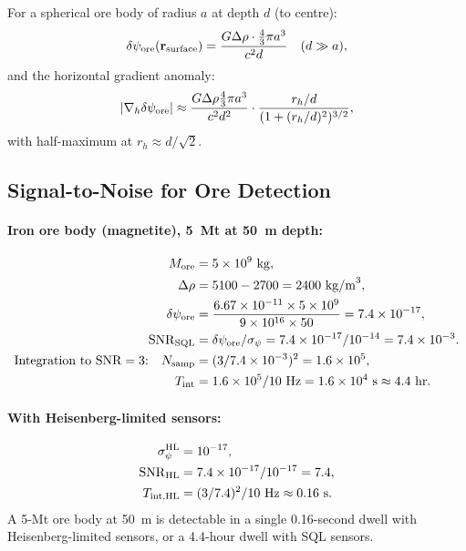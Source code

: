 \documentclass[aps,prd,twocolumn,superscriptaddress,nofootinbib]{revtex4-2}
\newcommand{\HL}{\mathrm{HL}}
\begin{document}
For a spherical ore body of radius $a$ at depth $d$ (to centre):
\begin{equation}
  \delta\psi_{\rm ore}(\mathbf{r}_{\rm surface})
  = \frac{G \Delta\rho \cdot \tfrac{4}{3}\pi a^3}{c^2 d}
  \quad(d \gg a),
  \label{eq:ore-psi}
\end{equation}
and the horizontal gradient anomaly:
\begin{equation}
  |\nabla_h\delta\psi_{\rm ore}| \approx \frac{G \Delta\rho \tfrac{4}{3}\pi a^3}
  {c^2 d^2}\cdot\frac{r_h/d}{(1 + (r_h/d)^2)^{3/2}},
  \label{eq:ore-grad}
\end{equation}
with half-maximum at $r_h \approx d/\sqrt{2}$.

\subsection{Signal-to-Noise for Ore Detection}

\paragraph{Iron ore body (magnetite), 5~Mt at 50~m depth:}
\begin{align}
  M_{\rm ore} &= 5\times10^9~\mathrm{kg}, \\
  \Delta\rho &= 5100 - 2700 = 2400~\mathrm{kg/m}^3, \\
  \delta\psi_{\rm ore} &= \frac{6.67\times10^{-11}\times5\times10^9}
  {9\times10^{16}\times50}
  = 7.4\times10^{-17}, \\
  \mathrm{SNR}_{\rm SQL} &= \delta\psi_{\rm ore}/\sigma_\psi
  = 7.4\times10^{-17}/10^{-14} = 7.4\times10^{-3}. \\
  \text{Integration to SNR}=3{:}\quad N_{\rm samp} &= (3/7.4\times10^{-3})^2
  = 1.6\times10^5, \\
  T_{\rm int} &= 1.6\times10^5/10~\mathrm{Hz} = 1.6\times10^4~\mathrm{s}
  \approx 4.4~\mathrm{hr}.
  \label{eq:ore-snr}
\end{align}

\paragraph{With Heisenberg-limited sensors:}
\begin{align}
  \sigma_\psi^{\HL} &= 10^{-17}, \\
  \mathrm{SNR}_{\HL} &= 7.4\times10^{-17}/10^{-17} = 7.4, \\
  T_{\rm int,HL} &= (3/7.4)^2/10~\mathrm{Hz} \approx 0.16~\mathrm{s}.
\end{align}
A 5-Mt ore body at 50~m is detectable in a single 0.16-second dwell
with Heisenberg-limited sensors, or a 4.4-hour dwell with SQL sensors.
\end{document}
